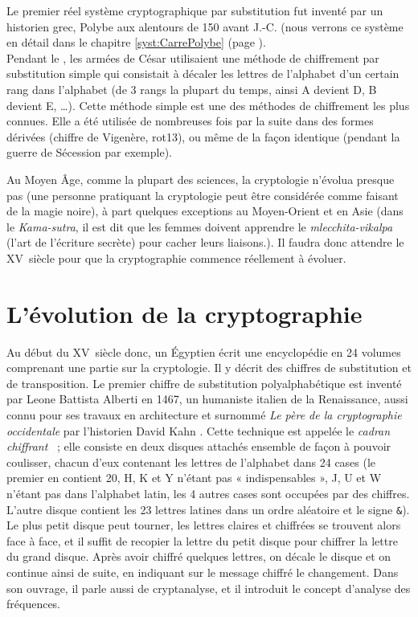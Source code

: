 Le premier réel système cryptographique par substitution fut inventé
par un historien grec, Polybe aux alentours de 150 avant J.-C. (nous
verrons ce système en détail dans le chapitre \ref{syst:CarrePolybe} (page
\pageref{syst:CarrePolybe}). \\

\label{syst:ChiffreCesar}
Pendant le , les armées de César utilisaient une méthode de
chiffrement par substitution simple qui consistait à décaler les
lettres de l'alphabet d'un certain rang dans l'alphabet (de 3 rangs la
plupart du temps, ainsi A devient D, B devient E, \dots). Cette 
méthode simple est une des méthodes de chiffrement les plus
connues. Elle a été
utilisée de nombreuses fois par la suite dans des formes dérivées (chiffre de
Vigenère, rot13), ou même
de la façon identique (pendant la guerre de Sécession par exemple).

Au Moyen Âge, comme la plupart des sciences, la cryptologie n'évolua
presque pas (une personne pratiquant la cryptologie peut être
considérée comme faisant de la magie noire), à part quelques exceptions
au Moyen-Orient et en Asie (dans le \emph{Kama-sutra}, il est dit que les
femmes doivent apprendre le \emph{mlecchita-vikalpa} (l'art de
l'écriture secrète) pour cacher leurs liaisons.). Il faudra donc
attendre le XV\ieme~siècle pour que la cryptographie commence
réellement à évoluer. \\

\section{L'évolution de la cryptographie}
Au début du XV\ieme~siècle donc, un Égyptien écrit une encyclopédie
en 24 volumes comprenant une partie sur la cryptologie. Il y décrit des
chiffres de substitution et de transposition. Le premier chiffre de
substitution polyalphabétique
est inventé par Leone Battista Alberti en 1467, un humaniste italien
de la Renaissance, aussi connu pour ses travaux en architecture et
surnommé \emph{Le père de la cryptographie occidentale} par
l'historien David Kahn \cite{Codebreakers}. Cette technique est appelée
le \emph{cadran chiffrant}\label{syst:CadranChiffrant} ~; elle consiste
en deux disques attachés ensemble de façon à pouvoir coulisser,
chacun d'eux contenant les lettres de l'alphabet dans 24 cases (le premier
en contient 20, H, K et Y n'étant pas « indispensables », J, U et W
n'étant pas dans l'alphabet latin, les 4 autres cases sont occupées
par des chiffres. L'autre disque contient les 23 lettres latines dans
un ordre aléatoire et le signe \texttt{\&}). Le plus petit disque peut tourner,
les lettres claires et chiffrées se trouvent alors face à face, et il
suffit de recopier la lettre du petit disque pour chiffrer la lettre
du grand disque. Après avoir chiffré quelques lettres, on décale le
disque et on continue ainsi de suite, en indiquant sur le message
chiffré le changement. Dans son ouvrage, il parle aussi de
cryptanalyse, et il introduit le concept d'analyse des
fréquences. \\


